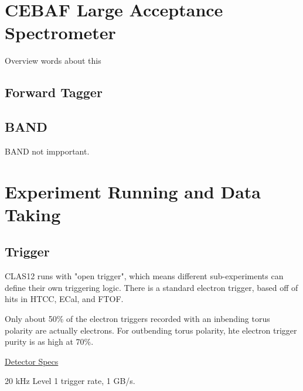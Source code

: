 \section{CEBAF Large Acceptance Spectrometer}\label{sec:clas12exp}
    Overview words about this
    
        

        

        \subsection{Forward Tagger}
        \subsection{BAND}
            BAND not impportant.









        


\section{Experiment Running and Data Taking}

        \subsection{Trigger}
            CLAS12 runs with "open trigger", which means different sub-experiments can define their own triggering logic. There is a standard electron trigger, based off of hits in HTCC, ECal, and FTOF. 

        Only about 50\% of the electron triggers recorded with an inbending torus polarity are actually electrons. For outbending torus polarity, hte electron trigger purity is as high at 70\%. 
    
    \href{https://www.jlab.org/Hall-B/clas12-web/}{Detector Specs}
    
    20 kHz Level 1 trigger rate, 1 GB/s.


    
    
